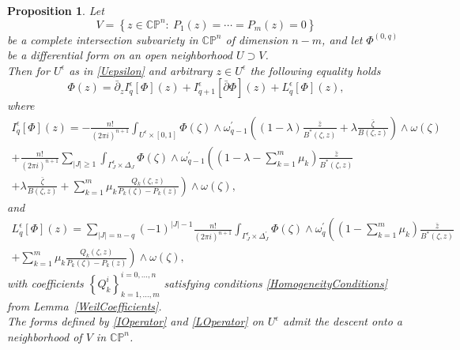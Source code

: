 \documentclass[11pt,reqno]{amsart}
\numberwithin{equation}{section}
\newtheorem{proposition}{Proposition}[section]
\begin{document}
\begin{proposition}\label{Formula} Let
$$V=\left\{z\in {{\mathbb C}}{{\mathbb P}}^n:\ P_1(z)=\cdots =P_m(z)=0\right\}$$
be a complete intersection subvariety in ${{\mathbb C}}{{\mathbb P}}^n$ of dimension $n-m$, and
let $\Phi^{(0,q)}$ be a differential form on an open neighborhood $U\supset V$.\\
\indent
Then for $U^{\epsilon}$ as in \eqref{Uepsilon} and arbitrary $z\in U^{\epsilon}$
the following equality holds
\begin{equation}\label{WeilLerayFormula}
\Phi(z)=\bar\partial_z I_q^{\epsilon}\left[\Phi\right](z)
+I_{q+1}^{\epsilon}\left[\bar\partial\Phi\right](z)+L_q^{\epsilon}\left[\Phi\right](z),
\end{equation}
where
\begin{multline}\label{IOperator}
I_q^{\epsilon}\left[\Phi\right](z)=-\frac{n!}{(2\pi i)^{n+1}}\int_{U^{\epsilon}\times[0,1]}
\Phi(\zeta)\wedge\omega^{\prime}_{q-1}\left((1-\lambda)\frac{\bar z}{B^*(\zeta,z)}
+\lambda\frac{\bar\zeta}{B(\zeta,z)}\right)\wedge\omega(\zeta)\\
+\frac{n!}{(2\pi i)^{n+1}}\sum_{|J|\geq 1}\int_{\Gamma^{\epsilon}_J\times\Delta_J}
\Phi(\zeta)\wedge 
\omega^{\prime}_{q-1}\left((1-\lambda-\sum_{k=1}^m\mu_k)
\frac{\bar z}{B^*(\zeta,z)}\right.\\
\left.+\lambda\frac{\bar\zeta}{B(\zeta,z)}
+\sum_{k=1}^m\mu_k\frac{Q_k(\zeta,z)}{P_k(\zeta)-P_k(z)}\right)
\wedge\omega(\zeta),
\end{multline}
and
\begin{multline}\label{LOperator}
L_q^{\epsilon}\left[\Phi\right](z)
=\sum_{|J|=n-q}(-1)^{|J|-1}\frac{n!}{(2\pi i)^{n+1}}
\int_{\Gamma^{\epsilon}_J\times\Delta^{\prime}_J}
\Phi(\zeta)\wedge\omega^{\prime}_q\left((1-\sum_{k=1}^m\mu_k)
\frac{\bar z}{B^*(\zeta,z)}\right.\\
\left.+\sum_{k=1}^m\mu_k\frac{Q_k(\zeta,z)}{P_k(\zeta)-P_k(z)}\right)
\wedge\omega(\zeta),
\end{multline}
with coefficients $\left\{Q_k^i\right\}_{k=1,\dots,m}^{i=0,\dots,n}$ satisfying conditions
\eqref{HomogeneityConditions} from Lemma~\ref{WeilCoefficients}.\\
\indent
The forms defined by \eqref{IOperator} and \eqref{LOperator} on $U^{\epsilon}$
admit the descent onto a neighborhood of $V$ in ${{\mathbb C}}{{\mathbb P}}^n$.
\end{proposition}
\end{document}
